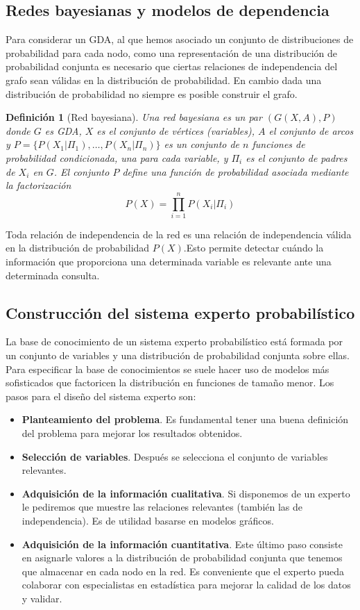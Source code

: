 \documentclass{article}
\theoremstyle{definition_wo_parentheses}
\newtheorem{definicion}{Definición}
\begin{document}
\subsection{Redes bayesianas y modelos de dependencia}

Para considerar un GDA, al que hemos asociado un conjunto de distribuciones de probabilidad para cada nodo, como una representación de una distribución de probabilidad conjunta es necesario que ciertas relaciones de independencia del grafo sean válidas en la distribución de probabilidad. En cambio dada una distribución de probabilidad no siempre es posible construir el grafo.

\begin{definicion}[Red bayesiana]
Una red bayesiana es un par $(G(X,A),P)$ donde $G$ es GDA, $X$ es el conjunto de vértices (variables), $A$ el conjunto de arcos y $P=\{P(X_1|\Pi_1),\dots,P(X_n|\Pi_n)\}$ es un conjunto de $n$ funciones de probabilidad condicionada, una para cada variable, y $\Pi_i$ es el conjunto de padres de $X_i$ en $G$. El conjunto $P$ define una función de probabilidad asociada mediante la factorización
\[ P(X) = \prod\limits_{i=1}^n P(X_i|\Pi_i)	\]
\end{definicion}

Toda relación de independencia de la red es una relación de independencia válida en la distribución de probabilidad $P(X)$.Esto permite detectar cuándo la información que proporciona una determinada variable es relevante ante una determinada consulta.

\subsection{Construcción del sistema experto probabilístico}

La base de conocimiento de un sistema experto probabilístico está formada por un conjunto de variables y una distribución de probabilidad conjunta sobre ellas. Para especificar la base de conocimientos se suele hacer uso de modelos más sofisticados que factoricen la distribución en funciones de tamaño menor. Los pasos para el diseño del sistema experto son:

\begin{itemize}
\item \textbf{Planteamiento del problema}. Es fundamental tener una buena definición del problema para mejorar los resultados obtenidos.
\item \textbf{Selección de variables}. Después se selecciona el conjunto de variables relevantes.
\item \textbf{Adquisición de la información cualitativa}. Si disponemos de un experto le pediremos que muestre las relaciones relevantes (también las de independencia). Es de utilidad basarse en modelos gráficos.
\item \textbf{Adquisición de la información cuantitativa}. Este último paso consiste en asignarle valores a la distribución de probabilidad conjunta que tenemos que almacenar en cada nodo en la red. Es conveniente que el experto pueda colaborar con especialistas en estadística para mejorar la calidad de los datos y validar.
\end{itemize}
\end{document}
